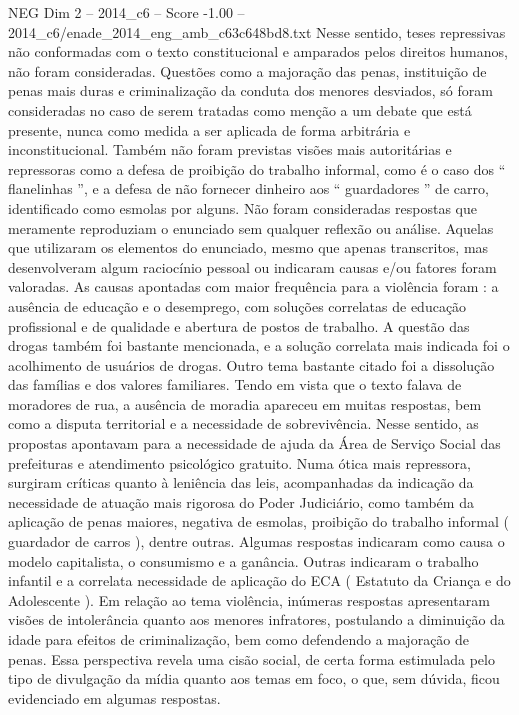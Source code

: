 \begin{textsample}{NEG Dim 2 – 2014\_c6 – Score -1.00 – 2014\_c6/enade\_2014\_eng\_amb\_c63c648bd8.txt}
Nesse sentido, teses repressivas não conformadas com o texto constitucional e amparados pelos direitos humanos, não foram consideradas.
Questões como a majoração das penas, instituição de penas mais duras e criminalização da conduta dos menores desviados, só foram consideradas no caso de serem tratadas como menção a um debate que está presente, nunca como medida a ser aplicada de forma arbitrária e inconstitucional.
Também não foram previstas visões mais autoritárias e repressoras como a defesa de proibição do trabalho informal, como é o caso dos “ flanelinhas ”, e a defesa de não fornecer dinheiro aos “ guardadores ” de carro, identificado como esmolas por alguns.
Não foram consideradas respostas que meramente reproduziam o enunciado sem qualquer reflexão ou análise.
Aquelas que utilizaram os elementos do enunciado, mesmo que apenas transcritos, mas desenvolveram algum raciocínio pessoal ou indicaram causas e/ou fatores foram valoradas.
As causas apontadas com maior frequência para a violência foram : a ausência de educação e o desemprego, com soluções correlatas de educação profissional e de qualidade e abertura de postos de trabalho.
A questão das drogas também foi bastante mencionada, e a solução correlata mais indicada foi o acolhimento de usuários de drogas.
Outro tema bastante citado foi a dissolução das famílias e dos valores familiares.
Tendo em vista que o texto falava de moradores de rua, a ausência de moradia apareceu em muitas respostas, bem como a disputa territorial e a necessidade de sobrevivência.
Nesse sentido, as propostas apontavam para a necessidade de ajuda da Área de Serviço Social das prefeituras e atendimento psicológico gratuito.
Numa ótica mais repressora, surgiram críticas quanto à leniência das leis, acompanhadas da indicação da necessidade de atuação mais rigorosa do Poder Judiciário, como também da aplicação de penas maiores, negativa de esmolas, proibição do trabalho informal ( guardador de carros ), dentre outras.
Algumas respostas indicaram como causa o modelo capitalista, o consumismo e a ganância.
Outras indicaram o trabalho infantil e a correlata necessidade de aplicação do ECA ( Estatuto da Criança e do Adolescente ).
Em relação ao tema violência, inúmeras respostas apresentaram visões de intolerância quanto aos menores infratores, postulando a diminuição da idade para efeitos de criminalização, bem como defendendo a majoração de penas.
Essa perspectiva revela uma cisão social, de certa forma estimulada pelo tipo de divulgação da mídia quanto aos temas em foco, o que, sem dúvida, ficou evidenciado em algumas respostas.

\end{textsample}

